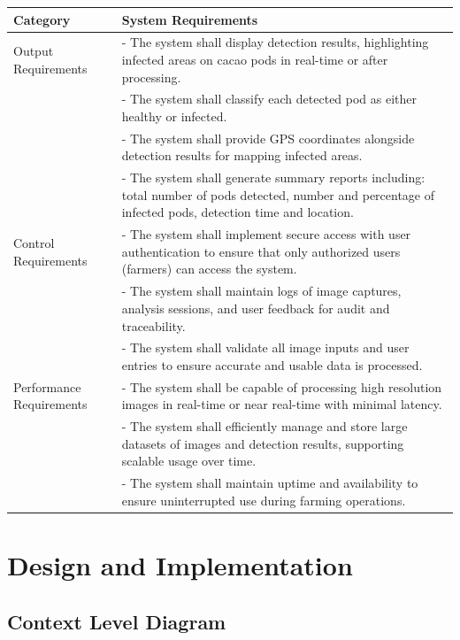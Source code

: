   \begin{table}[H]
    \centering
    \label{tab:sysreq2}
    \begin{tabular}{p{4cm} p{8cm}}
      \toprule
      \textbf{Category} & \textbf{System Requirements} \\
      \midrule
      Output Requirements & - The system shall display detection results, highlighting infected areas on cacao pods in real-time or after processing. \\
       & - The system shall classify each detected pod as either healthy or infected. \\
        & - The system shall provide GPS coordinates alongside detection results for mapping infected areas. \\
         & - The system shall generate summary reports including: total number of pods detected, number and percentage of infected pods, detection time and location. \\
         \midrule
      Control Requirements & - The system shall implement secure access with user authentication to ensure that only authorized users (farmers) can access the system. \\
       & - The system shall maintain logs of image captures, analysis sessions, and user feedback for audit and traceability. \\
        & - The system shall validate all image inputs and user entries to ensure accurate and usable data is processed. \\
        \midrule
      Performance Requirements & - The system shall be capable of processing high resolution images in real-time or near real-time with minimal latency. \\
       & - The system shall efficiently manage and store large datasets of images and detection results, supporting scalable usage over time. \\
        & - The system shall maintain uptime and availability to ensure uninterrupted use during farming operations. \\
        \bottomrule
    \end{tabular}
  \end{table}


	\section{Design and Implementation} 
	
	\subsection{Context Level Diagram}
	
